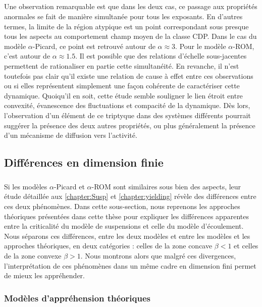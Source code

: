 \subparagraph{}Une observation remarquable est que dans les deux cas, ce passage aux propriétés anormales se fait de manière simultanée pour tous les exposants. En d'autres termes, la limite de la région atypique est un point correspondant sous presque tous les aspects au comportement champ moyen de la classe CDP. Dans le cas du modèle $\alpha$-Picard, ce point est retrouvé autour de $\alpha \approx 3$. Pour le modèle $\alpha$-ROM, c'est autour de $\alpha \approx 1.5$. Il est possible que des relations d'échelle sous-jacentes permettent de rationaliser en partie cette simultanéité. En revanche, il n'est toutefois pas clair qu'il existe une relation de cause à effet entre ces observations ou si elles représentent simplement une façon cohérente de caractériser cette dynamique. Quoiqu'il en soit, cette étude semble souligner le lien étroit entre convexité, évanescence des fluctuations et compacité de la dynamique. Dès lors, l'observation d'un élément de ce triptyque dans des systèmes différents pourrait suggérer la présence des deux autres propriétés, ou plus généralement la présence d'un mécanisme de diffusion vers l'activité.

\subsection{Différences en dimension finie}

\subparagraph{}Si les modèles $\alpha$-Picard et $\alpha$-ROM sont similaires sous bien des aspects, leur étude détaillée aux \autoref{chapter:Susp} et \autoref{chapter:yielding} révèle des différences entre ces deux phénomènes. Dans cette sous-section, nous reprenons les approches théoriques présentées dans cette thèse pour expliquer les différences apparentes entre la criticalité du modèle de suspensions et celle du modèle d'écoulement. Nous séparons ces différences, entre les deux modèles et entre les modèles et les approches théoriques, en deux catégories : celles de la zone concave $\beta < 1$ et celles de la zone convexe $\beta > 1$. Nous montrons alors que malgré ces divergences, l'interprétation de ces phénomènes dans un même cadre en dimension fini permet de mieux les appréhender.

\label{sec:Diff}

\subsubsection{Modèles d'appréhension théoriques}

